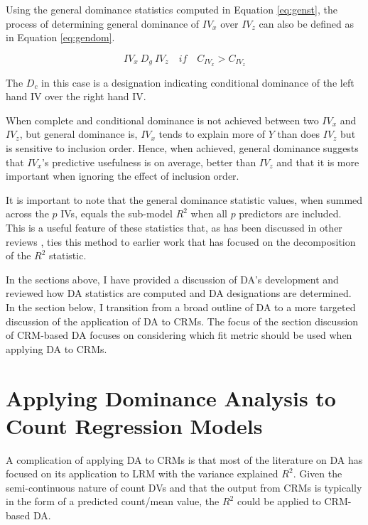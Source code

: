 \documentclass[ShortAfour,times,sageapa]{sagej}
\begin{document}
	Using the general dominance statistics computed in Equation \ref{eq:genst}, the process of determining general dominance of $IV_x$ over $IV_z$ can also be defined as in Equation \ref{eq:gendom}.
	
	\begin{equation}
		IV_x \ D_g \ IV_z \quad if \quad C_{IV_x} > C_{IV_z}
		\label{eq:gendom}
	\end{equation}
	
	The $D_c$ in this case is a designation indicating conditional dominance of the left hand IV over the right hand IV.
	
	When complete and conditional dominance is not achieved between two $IV_x$ and $IV_z$, but general dominance is, $IV_x$ tends to explain more of $Y$ than does $IV_z$ but is sensitive to inclusion order.
	Hence, when achieved, general dominance suggests that $IV_x$'s predictive usefulness is on average, better than $IV_z$ and that it is more important when ignoring the effect of inclusion order.
	
	It is important to note that the  general dominance statistic values, when summed across the $p$ IVs, equals the sub-model $R^2$ when all $p$ predictors are included.
	This is a useful feature of these statistics that, as has been discussed in other reviews \cite{gromping2007estimators,johnson2004history}, ties this method to earlier work that has focused on the decomposition of the $R^2$ statistic.

	In the sections above, I have provided a discussion of DA's development and reviewed how DA statistics are computed and DA designations are determined.
	In the section below, I transition from a broad outline of DA to a more targeted discussion of the application of DA to CRMs.
	The focus of the section discussion of CRM-based DA focuses on considering which fit metric should be used when applying DA to CRMs.
	
\section{Applying Dominance Analysis to Count Regression Models}

	A complication of applying DA to CRMs is that most of the literature on DA has focused on its application to LRM with the variance explained $R^2$.
	Given the semi-continuous nature of count DVs and that the output from CRMs is typically in the form of a predicted count/mean value, the $R^2$ could be applied to CRM-based DA.
	
\end{document}
